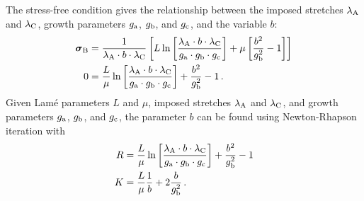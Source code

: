 \documentclass[10pt,letterpaper,oneside]{report}
\newcommand{\ten}[1]{\mbox{\boldmath $#1$}{}}
\newcommand{\scas}[1]{\mbox{{\scriptsize{${\rm{#1}}$}}}{}}
\begin{document}
The stress-free condition gives the relationship between the imposed stretches $\lambda_{\scas{A}}$ and $\lambda_{\scas{C}}$, growth parameters $g_{\scas{a}}$, $g_{\scas{b}}$, and $g_{\scas{c}}$, and the variable $b$:
\begin{align}
\ten{\sigma}_{\scas{B}} &= \frac{1}{\lambda_{\scas{A}} \cdot b \cdot \lambda_{\scas{C}}} \left[ L \ln \left[ \frac{\lambda_{\scas{A}} \cdot b \cdot \lambda_{\scas{C}} }{g_{\scas{a}} \cdot g_{\scas{b}} \cdot g_{\scas{c}}} \right] + \mu \left[ \frac{b^2}{g_{\scas{b}}^2} - 1 \right] \right] \\
0 &= \frac{L}{\mu} \ln \left[ \frac{\lambda_{\scas{A}} \cdot b \cdot \lambda_{\scas{C}} }{g_{\scas{a}} \cdot g_{\scas{b}} \cdot g_{\scas{c}}} \right] + \frac{b^2}{g_{\scas{b}}^2} - 1  \, .
\end{align}
Given Lamé parameters $L$ and $\mu$, imposed stretches $\lambda_{\scas{A}}$ and $\lambda_{\scas{C}}$, and growth parameters $g_{\scas{a}}$, $g_{\scas{b}}$, and $g_{\scas{c}}$, the parameter $b$ can be found using Newton-Rhapson iteration with 
\begin{align}
R &= \frac{L}{\mu} \ln \left[ \frac{\lambda_{\scas{A}} \cdot b \cdot \lambda_{\scas{C}} }{g_{\scas{a}} \cdot g_{\scas{b}} \cdot g_{\scas{c}}} \right] + \frac{b^2}{g_{\scas{b}}^2} - 1 \\
K &= \frac{L}{\mu} \frac{1}{b} + 2 \frac{b}{g_{\scas{b}}^2} \, .
\end{align}
\end{document}

